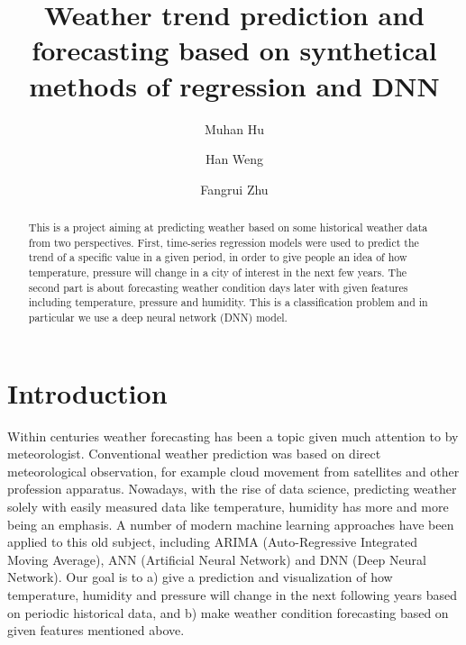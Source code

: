 \documentclass[runningheads]{llncs}
\begin{document}
\title{Weather trend prediction and forecasting based on synthetical methods of regression and DNN}
\author{Muhan Hu \and Han Weng \and Fangrui Zhu}


\maketitle 

\begin{abstract}
    This is a project aiming at predicting weather based on some historical weather data from two perspectives. First, time-series regression models were used to predict the trend of a specific value in a given period, in order to give people an idea of how temperature, pressure will change in a city of interest in the next few years. The second part is about forecasting weather condition days later with given features including temperature, pressure and humidity. This is a classification problem and in particular we use a deep neural network (DNN) model.
    
\end{abstract}

\section{Introduction}
Within centuries weather forecasting has been a topic given much attention to by meteorologist. Conventional weather prediction was based on direct meteorological observation, for example cloud movement from satellites and other profession apparatus. Nowadays, with the rise of data science, predicting weather solely with easily measured data like temperature, humidity has more and more being an emphasis. A number of modern machine learning approaches have been applied to this old subject, including ARIMA (Auto-Regressive Integrated Moving Average), ANN (Artificial Neural Network)\cite{abrahamsen2018machine,holmstrom2016machine} and DNN (Deep Neural Network)\cite{liu2014deep}. Our goal is to a) give a prediction and visualization of how temperature, humidity and pressure will change in the next following years based on periodic historical data, and b) make weather condition forecasting based on given features mentioned above.
\end{document}
